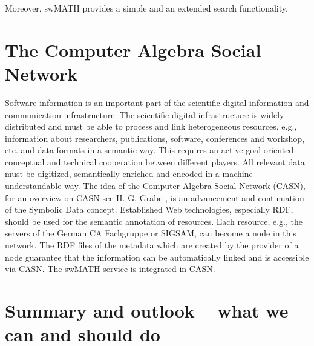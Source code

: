\documentclass[12pt]{article}
\begin{document}
Moreover, swMATH provides a simple and an extended search functionality.\\


\section{The Computer Algebra Social Network}
Software information is an important part of the scientific digital information and communication infrastructure. The scientific digital infrastructure is  widely distributed and must be able to process and link heterogeneous resources, e.g., information about researchers,  publications, software, conferences and workshop, etc. and data formats  in a semantic way.
This requires an active goal-oriented conceptual and technical cooperation between different players. All relevant data must be digitized, semantically enriched and encoded in a machine-understandable way.
The idea of the Computer Algebra Social Network (CASN), for an overview on CASN see H.-G. Gr\"abe \cite{CASN},   is an advancement and continuation of the Symbolic Data concept. Established Web technologies, especially RDF, should be used for the semantic annotation of resources. Each resource, e.g., the servers of the German CA Fachgruppe or SIGSAM, can become a node in this network. The RDF files of the metadata which are created by the provider of a node guarantee that the information can be automatically linked and is accessible via CASN. The swMATH service is integrated in CASN.


\section{Summary and outlook -- what we can and should do}
\end{document}
